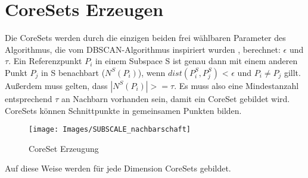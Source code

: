 \section{CoreSets Erzeugen}

Die CoreSets werden durch die einzigen beiden frei wählbaren Parameter des Algorithmus, die vom
DBSCAN-Algorithmus inspiriert wurden \cite{Kaur.2014}, berechnet: $\epsilon$ und $\tau$. Ein
Referenzpunkt $P_{i}$ in
einem Subspace S ist genau dann mit einem anderen Punkt $P_{j}$ in S benachbart ($N^{S}(P_{i})$),
wenn $dist(P_{i}^{S}, P_{j}^{S})$ < $\epsilon$ und $P_{i} \neq P_{j}$ gillt. Außerdem muss gelten,
dass
$|N^{S}(P_{i})| >= \tau$. Es muss also eine Mindestanzahl entsprechend $\tau$ an Nachbarn vorhanden
sein, damit ein CoreSet gebildet wird.
CoreSets können Schnittpunkte in gemeinsamen Punkten bilden.

\begin{figure}[h]
    \centering
    \texttt{[image: Images/SUBSCALE\_nachbarschaft]}
    \caption[Corset Erzeugung]{CoreSet Erzeugung}
    \label{img:CoresetsErzeugen}
\end{figure}


Auf diese Weise werden für jede Dimension CoreSets gebildet.